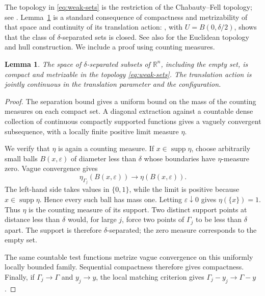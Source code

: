 \documentclass[a4paper,12pt,reqno]{amsart}
\newtheorem{lemma}[theorem]{Lemma}
\theoremstyle{remark}
\numberwithin{equation}{section}
\newcommand{\R}{\mathbb R}
\DeclareMathOperator{\supp}{supp}
\begin{document}
The topology in \eqref{eq:weak-sets} is the restriction of the
Chabauty--Fell topology; see
\cite[Appendix~A, Proposition~A.1]{BjorklundHartnickPogorzelski}.
Lemma~\ref{lem:hull} is a standard consequence of compactness and
metrizability of that space and continuity of its translation action:
\cite[Proposition~2.2(ii)]{EnstadRaum}, with $U=B(0,\delta/2)$, shows
that the class of $\delta$-separated sets is closed. See also
\cite[Theorem~1.2, Proposition~1.3 and Remark~1.5(c)]{LenzStollmann}
for the Euclidean topology and hull construction. We include a proof
using counting measures.

\begin{lemma}\label{lem:hull}
The space of $\delta$-separated subsets of $\R^n$, including the empty
set, is compact and metrizable in the topology \eqref{eq:weak-sets}.
The translation action is jointly continuous in the translation parameter
and the configuration.
\end{lemma}

\begin{proof}
The separation bound gives a uniform bound on the mass of the counting
measures on each compact set. A diagonal extraction against a countable
dense collection of continuous compactly supported functions gives a
vaguely convergent subsequence, with a locally finite positive limit
measure $\eta$.


We verify that $\eta$ is again a counting measure. If
$x\in\supp\eta$, choose arbitrarily small balls $B(x,\varepsilon)$ of
diameter less than $\delta$ whose boundaries have $\eta$-measure zero.
Vague convergence gives
\[
 \eta_{\Gamma_j}(B(x,\varepsilon))
 \longrightarrow\eta(B(x,\varepsilon)).
\]
The left-hand side takes values in $\{0,1\}$, while the limit is positive
because $x\in\supp\eta$. Hence every such ball has mass one. Letting
$\varepsilon\downarrow0$ gives $\eta(\{x\})=1$. Thus $\eta$ is the
counting measure of its support. Two distinct support points at distance
less than $\delta$ would, for large $j$, force two points of $\Gamma_j$
to be less than $\delta$ apart. The support is therefore
$\delta$-separated; the zero measure corresponds to the empty set.


The same countable test functions metrize vague convergence on this
uniformly locally bounded family. Sequential compactness therefore gives
compactness. Finally, if $\Gamma_j\to\Gamma$ and $y_j\to y$, the local
matching criterion gives $\Gamma_j-y_j\to\Gamma-y$.
\end{proof}
\end{document}

